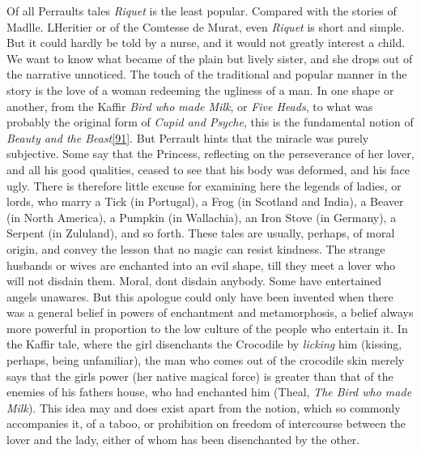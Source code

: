 \documentclass[14pt,a4paper]{memoir}
\begin{document}
Of all Perrault\textquotesingle s tales \emph{Riquet} is the least
popular. Compared with the stories of Madlle. L\textquotesingle Heritier
or of the Comtesse de Murat, even \emph{Riquet} is short and simple. But
it could hardly be told by a nurse, and it would not greatly interest a
child. We want to know what became of the plain but lively sister, and
she drops out of the narrative unnoticed. The touch of the traditional
and popular manner in the story is the love of a woman redeeming the
ugliness of a man. In one shape or another, from the Kaffir \emph{Bird
who made Milk}, or \emph{Five Heads}, to what was probably the original
form of \emph{Cupid and Psyche}, this is the fundamental notion of
\emph{Beauty and the
Beast}\protect\hypertarget{4533318093929944247_33931-h-1.htm.xhtmlux5cux23FNanchor_91}{}{}\protect\hyperlink{4533318093929944247_33931-h-1.htm.xhtmlux5cux23Footnote_91}{{[}91{]}}.
But Perrault hints that the miracle was purely
\textquotesingle subjective.\textquotesingle{} \textquotesingle Some say
that the Princess, reflecting on the perseverance of her lover, and all
his good qualities, ceased to see that his body was deformed, and his
face ugly.\textquotesingle{} There is therefore little excuse for
examining here the legends of ladies, or lords, who marry a Tick (in
Portugal), a Frog (in Scotland and India), a Beaver (in North America),
a Pumpkin (in Wallachia), an Iron Stove (in Germany), a Serpent (in
Zululand), and so forth. These tales are usually, perhaps, of moral
origin, and convey the lesson that no magic can resist kindness. The
strange husbands or wives are enchanted into an evil shape, till they
meet a lover who will not disdain them. Moral, don\textquotesingle t
disdain anybody. Some have entertained angels unawares. But this
apologue could only have been invented when there was a general belief
in powers of enchantment and metamorphosis, a belief always more
powerful in proportion to the low culture of the people who entertain
it. In the Kaffir tale, where the girl disenchants the Crocodile by
\emph{licking} him (kissing, perhaps, being unfamiliar), the man who
comes out of the crocodile skin merely says that the
girl\textquotesingle s \textquotesingle power\textquotesingle{} (her
native magical force) is greater than that of \textquotesingle the
enemies of his father\textquotesingle s house,\textquotesingle{} who had
enchanted him (Theal, \emph{The Bird who made Milk}). This idea may and
does exist apart from the notion, which so commonly accompanies it, of a
taboo, or prohibition on freedom of intercourse between the lover and
the lady, either of whom has been disenchanted by the other.
\end{document}
